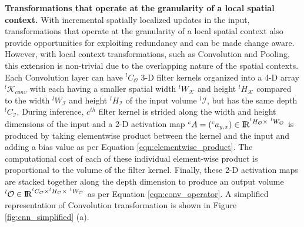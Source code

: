 
\vspace{2mm}
\noindent \textbf{Transformations that operate at the granularity of a local spatial context.}
With incremental spatially localized updates in the input, transformations that operate at the granularity of a local spatial context also provide opportunities for exploiting redundancy and can be made change aware.
However, with local context transformations, such as Convolution and Pooling, this extension is non-trivial due to the overlapping nature of the spatial contexts.
Each Convolution layer can have $^lC_{\mathcal{O}}$ 3-D filter kernels organized into a 4-D array $^l\mathcal{K}_{conv}$ with each having a smaller spatial width $^lW_\mathcal{K}$ and height $^lH_\mathcal{K}$ compared to the width $^lW_{\mathcal{I}}$ and height $^lH_{\mathcal{I}}$ of the input volume $^l\mathcal{I}$, but has the same depth $^lC_{\mathcal{I}}$.
During inference, $c^{th}$ filter kernel is strided along the width and height dimensions of the input and a 2-D activation map $^cA=(^ca_{y,x})\in \mathcal{\rm I\!R}^{^lH_{\mathcal{O}} \times~ ^lW_{\mathcal{O}}}$ is produced by taking element\-wise product between the kernel and the input and adding a bias value as per Equation \ref{eqn:elementwise_product}.
The computational cost of each of these individual element-wise product is proportional to the volume of the filter kernel.
Finally, these 2-D activation maps are stacked together along the depth dimension to produce an output volume $^{l}\mathcal{O} \in \mathcal{\rm I\!R}^{^lC_\mathcal{O} \times {}^lH_{\mathcal{O}} \times~ ^lW_{\mathcal{O}}}$ as per Equation \ref{eqn:conv_operator}.
A simplified representation of Convolution transformation is shown in Figure \ref{fig:cnn_simplified} (a).



